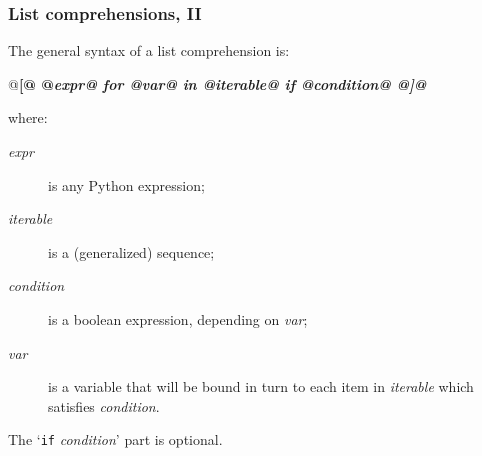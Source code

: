 \documentclass[english,serif,mathserif,xcolor=pdftex,dvipsnames,table]{beamer}
\begin{document}
\begin{frame}[fragile]
  \frametitle{List comprehensions, II}
  \def\e{\ttfamily\itshape}

  The general syntax of a list comprehension is:
  \begin{python}
    @\bf[@ @\e expr@ for @\e var@ in @\e iterable@ if @\e condition@ @\bf]@
  \end{python}
  where:
  \begin{description}
  \item[\e expr] is any Python expression;
  \item[\e iterable] is a (generalized) sequence;
  \item[\e condition] is a boolean expression, depending on
    {\e var};
  \item[\e var] is a variable that will be bound in turn to each item
    in {\e iterable} which satisfies {\e condition}.
  \end{description}

  \+
  The `{\lstinline|if| \e condition}' part is optional.
\end{frame}







\end{document}
